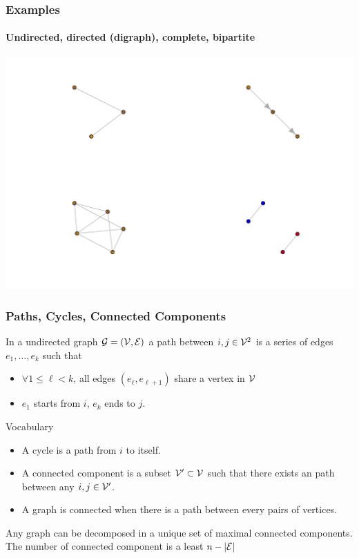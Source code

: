 \documentclass{beamer}\usepackage[]{graphicx}\usepackage[]{color}
\newenvironment{knitrout}{}{} %
\begin{document}
\begin{frame}[fragile]
\frametitle{Examples}
\framesubtitle{Undirected, directed (digraph), complete, bipartite}

\begin{knitrout}\scriptsize
{}\color{fgcolor}
\includegraphics[width=.8\textwidth]{figures/basic_graphs-1} 

\end{knitrout}

\end{frame}

\begin{frame}[allowframebreaks]
  \frametitle{Paths, Cycles, Connected Components}

  \begin{definition}[Path]
    In a undirected graph $\mathcal{G} = (\mathcal{V},\mathcal{E})$ a path  between $i,j\in \mathcal{V}^2$ is a series of edges $e_1,\dots,e_k$ such that
    \begin{itemize}
      \item  $\forall 1 \leq \ell < k$, all edges $(e_\ell, e_{\ell+1})$ share a vertex in $\mathcal{V}$
      \item  $e_1$ starts from $i$, $e_k$ ends to $j$.
    \end{itemize}
  \end{definition}

  \begin{block}{Vocabulary}
    \vspace{-.25cm}
    \begin{itemize}
    \item  A \alert{cycle} is a path from $i$ to itself.
    \item  A \alert{connected component} is a subset $\mathcal{V}'\subset\mathcal{V}$ such that there exists an path between any $i,j\in\mathcal{V}'$.
    \item A graph is \alert{connected} when there is a path between every pairs of vertices.
    \end{itemize}
  \end{block}

  \begin{proposition}[Decomposition]
    Any graph can be decomposed in a unique set of maximal connected components. The number of connected component is a least $n - |\mathcal{E}|$
  \end{proposition}

\end{frame}
\end{document}
